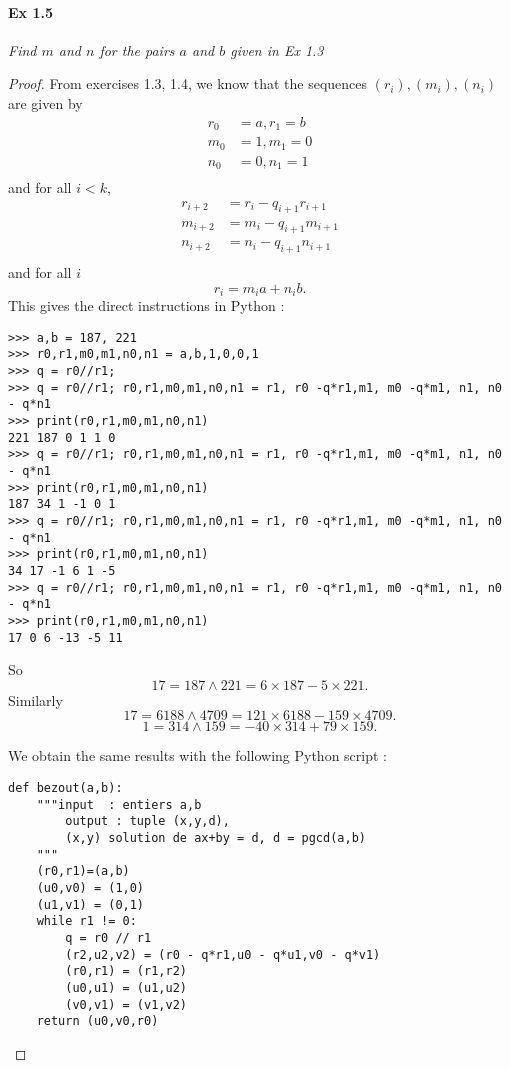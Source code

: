 \documentclass[11pt,a4paper]{article}
\begin{document}
{\paragraph {  Ex 1.5} 
{\it Find $m$ and $n$ for the pairs $a$ and $b$ given in Ex 1.3}
\begin{proof}
From exercises 1.3,  1.4, we know that the sequences $(r_i),(m_i),(n_i)$ are given by
\begin{align*}
r_0 &= a ,r_1 = b\\
m_0 &= 1, m_1 = 0\\
n_0 &= 0,n_1 = 1\\
\end{align*}
and for all $i <k$, 
\begin{align*}
r_{i+2}&= r_{i} -q_{i+1} r_{i+1}\\
m_{i+2}&= m_{i} -q_{i+1} m_{i+1}\\
n_{i+2}&= n_{i} -q_{i+1} n_{i+1}\\
\end{align*}
and for all $i$ 
$$r_{i} = m_i a +n_i b.$$
This gives the direct instructions in Python :
\begin{verbatim}
>>> a,b = 187, 221
>>> r0,r1,m0,m1,n0,n1 = a,b,1,0,0,1  
>>> q = r0//r1; 
>>> q = r0//r1; r0,r1,m0,m1,n0,n1 = r1, r0 -q*r1,m1, m0 -q*m1, n1, n0 - q*n1
>>> print(r0,r1,m0,m1,n0,n1)
221 187 0 1 1 0
>>> q = r0//r1; r0,r1,m0,m1,n0,n1 = r1, r0 -q*r1,m1, m0 -q*m1, n1, n0 - q*n1
>>> print(r0,r1,m0,m1,n0,n1)
187 34 1 -1 0 1
>>> q = r0//r1; r0,r1,m0,m1,n0,n1 = r1, r0 -q*r1,m1, m0 -q*m1, n1, n0 - q*n1
>>> print(r0,r1,m0,m1,n0,n1)
34 17 -1 6 1 -5
>>> q = r0//r1; r0,r1,m0,m1,n0,n1 = r1, r0 -q*r1,m1, m0 -q*m1, n1, n0 - q*n1
>>> print(r0,r1,m0,m1,n0,n1)
17 0 6 -13 -5 11
\end{verbatim}
So
 $$17 = 187 \wedge 221 = 6 \times 187 - 5 \times 221.$$
Similarly
$$ 17 = 6188 \wedge 4709 = 121 \times 6188 - 159 \times 4709.$$
$$1 = 314 \wedge 159 = -40 \times 314 + 79 \times159.$$

We obtain the same results with the following Python script :
\begin{verbatim}
def bezout(a,b):
    """input  : entiers a,b
        output : tuple (x,y,d),
        (x,y) solution de ax+by = d, d = pgcd(a,b)
    """
    (r0,r1)=(a,b)
    (u0,v0) = (1,0)
    (u1,v1) = (0,1)
    while r1 != 0:
        q = r0 // r1
        (r2,u2,v2) = (r0 - q*r1,u0 - q*u1,v0 - q*v1)
        (r0,r1) = (r1,r2)
        (u0,u1) = (u1,u2)
        (v0,v1) = (v1,v2)
    return (u0,v0,r0)
\end{verbatim}
\end{proof}

}
\end{document}
